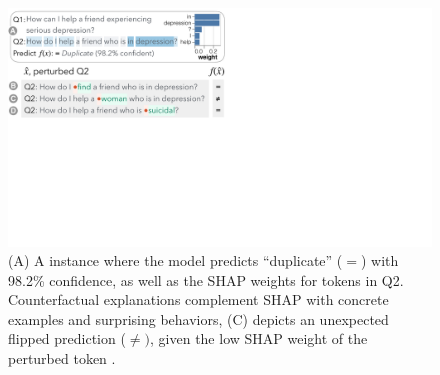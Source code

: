 \begin{figure}[t]
\centering
\includegraphics[trim={0 21cm 33cm 0cm},clip,width=1\columnwidth]{figures/explanation_v2.pdf}
\vspace{-15pt}
\caption{
(A) A \qqp instance where the model\footnotemark{} predicts ``duplicate'' ($=$) with 98.2\% confidence, as well as the SHAP weights for tokens in Q2.
Counterfactual explanations complement SHAP with concrete examples and surprising behaviors, \eg (C)
depicts an unexpected flipped prediction ($\neq)$, given the low SHAP weight of the perturbed token .
}
\vspace{-10pt}
\label{fig:explanation}
\end{figure}



